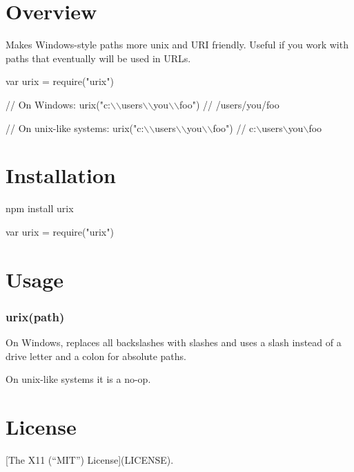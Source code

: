 \href{https://travis-ci.org/lydell/urix}{\tt }

\section*{Overview }

Makes Windows-\/style paths more unix and U\+RI friendly. Useful if you work with paths that eventually will be used in U\+R\+Ls.


\begin{DoxyCode}
var urix = require("urix")

// On Windows:
urix("c:\(\backslash\)\(\backslash\)users\(\backslash\)\(\backslash\)you\(\backslash\)\(\backslash\)foo")
// /users/you/foo

// On unix-like systems:
urix("c:\(\backslash\)\(\backslash\)users\(\backslash\)\(\backslash\)you\(\backslash\)\(\backslash\)foo")
// c:\(\backslash\)users\(\backslash\)you\(\backslash\)foo
\end{DoxyCode}


\section*{Installation }

{\ttfamily npm install urix}


\begin{DoxyCode}
var urix = require("urix")
\end{DoxyCode}


\section*{Usage }

\subsubsection*{{\ttfamily urix(path)}}

On Windows, replaces all backslashes with slashes and uses a slash instead of a drive letter and a colon for absolute paths.

On unix-\/like systems it is a no-\/op.

\section*{License }

\mbox{[}The X11 (“\+M\+I\+T”) License\mbox{]}(L\+I\+C\+E\+N\+SE). 